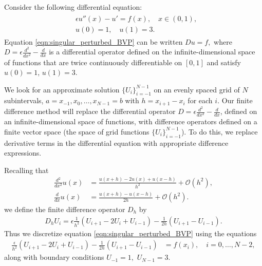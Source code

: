 Consider the following differential equation: 
\begin{align}
	\begin{split}
	&{ } \epsilon u''(x)-u'= f(x), \quad x \in (0,1), \\
	&{ } u(0) = 1, \quad u(1) = 3.
	\end{split} \label{eqn:singular_perturbed_BVP}
\end{align}
Equation \eqref{eqn:singular_perturbed_BVP} can be written $D u = f,$ where $D = \epsilon \frac{d^2}{dx^2} - \frac{d}{dx}$ is a differential operator defined on the infinite-dimensional space of functions that are twice continuously differentiable on $[0,1]$ and satisfy $u(0) = 1$, $u(1) = 3$.

We look for an approximate solution $\{U_i\}_{i=-1}^{N-1}$ on an evenly spaced grid of $N$ subintervals, $a = x_{-1}, x_0, \ldots, x_{N-1} = b$ with $h = x_{i+1}-x_i$ for each $i$.
Our finite difference method will replace the differential operator $D = \epsilon \frac{d^2}{dx^2} - \frac{d}{dx}$, defined on an infinite-dimensional space of functions, with difference operators defined on a finite vector space (the space of grid functions $\{U_i\}_{i=-1}^{N-1}$).
To do this, we replace derivative terms in the differential equation with appropriate difference expressions.

Recalling that 
\begin{align*}
	\frac{d^2}{dx^2} u(x) &= \frac{u(x+h)- 2u(x) + u(x-h)}{h^2} + \mathcal{O}(h^2),\\
\frac{d}{dx} u(x) &= \frac{u(x+h)-u(x-h)}{2h} + \mathcal{O}(h^2).
\end{align*}
we define the finite difference operator $D_h$ by  
\begin{align}
D_h U_i = \epsilon \frac{1}{h^2}\left(U_{i+1} -2U_i + U_{i-1}\right) - \frac{1}{2h} \left(U_{i+1}-U_{i-1} \right). \label{fd_operator}
\end{align}
Thus we discretize equation \eqref{eqn:singular_perturbed_BVP} using the equations 
\begin{align*}
	\frac{\epsilon}{h^2} (U_{i+1}- 2U_i + U_{i-1}) - \frac{1}{2h} \left(U_{i+1}-U_{i-1} \right)  &= f(x_i), \quad i = 0, \ldots, N-2,
\end{align*}
along with boundary conditions $U_{-1} = 1,$ $U_{N-1} = 3$.

